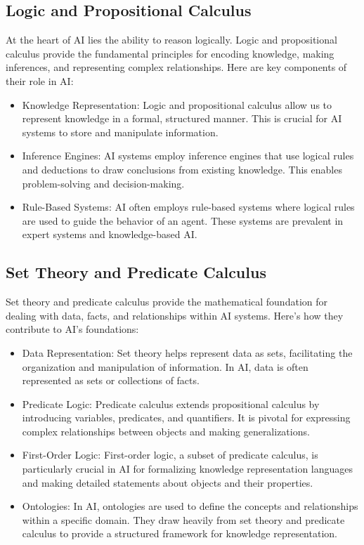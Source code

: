 \documentclass[conference]{IEEEtran}
\begin{document}
    \subsection{Logic and Propositional Calculus}
    At the heart of AI lies the ability to reason logically. Logic and propositional calculus provide the fundamental principles for encoding knowledge, making inferences, and representing complex relationships. Here are key components of their role in AI:
    \begin{itemize}
      \item Knowledge Representation: Logic and propositional calculus allow us to represent knowledge in a formal, structured manner. This is crucial for AI systems to store and manipulate information.
      \item Inference Engines: AI systems employ inference engines that use logical rules and deductions to draw conclusions from existing knowledge. This enables problem-solving and decision-making.
      \item Rule-Based Systems: AI often employs rule-based systems where logical rules are used to guide the behavior of an agent. These systems are prevalent in expert systems and knowledge-based AI.
    \end{itemize}

    \subsection{Set Theory and Predicate Calculus}
    Set theory and predicate calculus provide the mathematical foundation for dealing with data, facts, and relationships within AI systems. Here's how they contribute to AI's foundations:
    \begin{itemize}
      \item Data Representation: Set theory helps represent data as sets, facilitating the organization and manipulation of information. In AI, data is often represented as sets or collections of facts.

      \item Predicate Logic: Predicate calculus extends propositional calculus by introducing variables, predicates, and quantifiers. It is pivotal for expressing complex relationships between objects and making generalizations.

    \item First-Order Logic: First-order logic, a subset of predicate calculus, is particularly crucial in AI for formalizing knowledge representation languages and making detailed statements about objects and their properties.

    \item Ontologies: In AI, ontologies are used to define the concepts and relationships within a specific domain. They draw heavily from set theory and predicate calculus to provide a structured framework for knowledge representation.
    \end{itemize}
\end{document}

